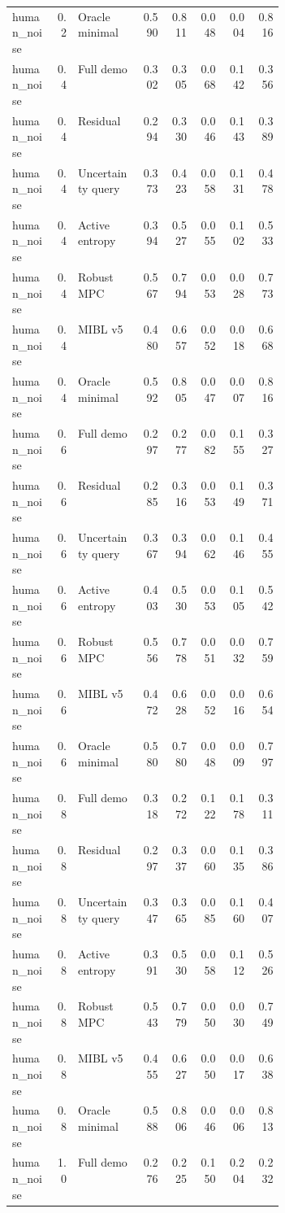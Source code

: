 \documentclass{article}
\begin{document}
\begin{center}
\begin{longtable}{p{0.16\linewidth}rp{0.23\linewidth}rrrrr}
human\_noise & 0.2 & Oracle minimal & 0.590 & 0.811 & 0.048 & 0.004 & 0.816\\
human\_noise & 0.4 & Full demo & 0.302 & 0.305 & 0.068 & 0.142 & 0.356\\
human\_noise & 0.4 & Residual & 0.294 & 0.330 & 0.046 & 0.143 & 0.389\\
human\_noise & 0.4 & Uncertainty query & 0.373 & 0.423 & 0.058 & 0.131 & 0.478\\
human\_noise & 0.4 & Active entropy & 0.394 & 0.527 & 0.055 & 0.102 & 0.533\\
human\_noise & 0.4 & Robust MPC & 0.567 & 0.794 & 0.053 & 0.028 & 0.773\\
human\_noise & 0.4 & MIBL v5 & 0.480 & 0.657 & 0.052 & 0.018 & 0.668\\
human\_noise & 0.4 & Oracle minimal & 0.592 & 0.805 & 0.047 & 0.007 & 0.816\\
human\_noise & 0.6 & Full demo & 0.297 & 0.277 & 0.082 & 0.155 & 0.327\\
human\_noise & 0.6 & Residual & 0.285 & 0.316 & 0.053 & 0.149 & 0.371\\
human\_noise & 0.6 & Uncertainty query & 0.367 & 0.394 & 0.062 & 0.146 & 0.455\\
human\_noise & 0.6 & Active entropy & 0.403 & 0.530 & 0.053 & 0.105 & 0.542\\
human\_noise & 0.6 & Robust MPC & 0.556 & 0.778 & 0.051 & 0.032 & 0.759\\
human\_noise & 0.6 & MIBL v5 & 0.472 & 0.628 & 0.052 & 0.016 & 0.654\\
human\_noise & 0.6 & Oracle minimal & 0.580 & 0.780 & 0.048 & 0.009 & 0.797\\
human\_noise & 0.8 & Full demo & 0.318 & 0.272 & 0.122 & 0.178 & 0.311\\
human\_noise & 0.8 & Residual & 0.297 & 0.337 & 0.060 & 0.135 & 0.386\\
human\_noise & 0.8 & Uncertainty query & 0.347 & 0.365 & 0.085 & 0.160 & 0.407\\
human\_noise & 0.8 & Active entropy & 0.391 & 0.530 & 0.058 & 0.112 & 0.526\\
human\_noise & 0.8 & Robust MPC & 0.543 & 0.779 & 0.050 & 0.030 & 0.749\\
human\_noise & 0.8 & MIBL v5 & 0.455 & 0.627 & 0.050 & 0.017 & 0.638\\
human\_noise & 0.8 & Oracle minimal & 0.588 & 0.806 & 0.046 & 0.006 & 0.813\\
human\_noise & 1.0 & Full demo & 0.276 & 0.225 & 0.150 & 0.204 & 0.232\\

\end{longtable}
\end{center}
\end{document}
